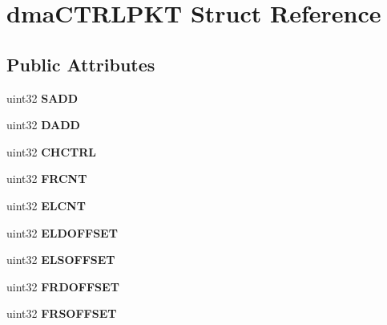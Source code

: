 \hypertarget{structdmaCTRLPKT}{}\section{dma\+C\+T\+R\+L\+P\+KT Struct Reference}
\label{structdmaCTRLPKT}
\subsection*{Public Attributes}
\begin{DoxyCompactItemize}
\item 
\mbox{\label{structdmaCTRLPKT_af08c9f15c97e6371c69720d9bb933bc5}} 
uint32 {\bfseries S\+A\+DD}
\item 
\mbox{\label{structdmaCTRLPKT_a7e350ef55ba05654e29e2b0e8b03e4b2}} 
uint32 {\bfseries D\+A\+DD}
\item 
\mbox{\label{structdmaCTRLPKT_a138f9d425efe2238f2010a5bc94b7554}} 
uint32 {\bfseries C\+H\+C\+T\+RL}
\item 
\mbox{\label{structdmaCTRLPKT_a66d27173cde06d2074236125b73e8a49}} 
uint32 {\bfseries F\+R\+C\+NT}
\item 
\mbox{\label{structdmaCTRLPKT_aacbb51912f1ad7e7de4230f53da9d849}} 
uint32 {\bfseries E\+L\+C\+NT}
\item 
\mbox{\label{structdmaCTRLPKT_a58e395352e2a10bc8571549abc314929}} 
uint32 {\bfseries E\+L\+D\+O\+F\+F\+S\+ET}
\item 
\mbox{\label{structdmaCTRLPKT_a0ec7c6808778eaefa00082045be2a3d3}} 
uint32 {\bfseries E\+L\+S\+O\+F\+F\+S\+ET}
\item 
\mbox{\label{structdmaCTRLPKT_a5bfd895b6a357e1939fa69dac3ea7981}} 
uint32 {\bfseries F\+R\+D\+O\+F\+F\+S\+ET}
\item 
\mbox{\label{structdmaCTRLPKT_a0618ff61ee90f74bc597b365cca211de}} 
uint32 {\bfseries F\+R\+S\+O\+F\+F\+S\+ET}
\item 
\mbox{\label{structdmaCTRLPKT_aecc614ac136fbd76dd0eb2a5a770e190}} 

\end{DoxyCompactItemize}
